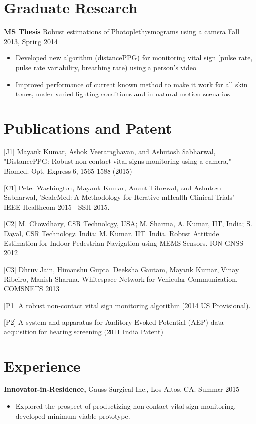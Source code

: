 \documentclass[margin]{res}
\begin{document}
\begin{resume}
\section{Graduate Research}
\textbf{MS Thesis} Robust estimations of Photoplethysmograms using a camera \hfill{Fall 2013, Spring 2014 }\\
 \begin{itemize} \itemsep -2pt  %
 \item Developed new algorithm (distancePPG) for monitoring vital sign (pulse rate, pulse rate variability, breathing rate) using a person's video 
 \item Improved performance of current known method to make it work for all skin tones, under varied lighting conditions and in natural motion scenarios 
 \end{itemize}

\section{Publications and Patent}
[J1] Mayank Kumar, Ashok Veeraraghavan, and Ashutosh Sabharwal, "DistancePPG: Robust non-contact vital signs monitoring using a camera," Biomed. Opt. Express 6, 1565-1588 (2015)

[C1] Peter Washington, Mayank Kumar, Anant Tibrewal, and Ashutosh Sabharwal, 'ScaleMed: A Methodology for Iterative mHealth Clinical Trials' IEEE Healthcom 2015 - SSH 2015.

[C2] M. Chowdhary, CSR Technology, USA; M. Sharma, A. Kumar, IIT, India; S. Dayal, CSR Technology, India; M. Kumar, IIT, India. Robust Attitude Estimation for Indoor Pedestrian Navigation using MEMS Sensors. ION GNSS 2012 

[C3] Dhruv Jain, Himanshu Gupta, Deeksha Gautam, Mayank Kumar, Vinay Ribeiro, Manish Sharma. Whitespace Network for Vehicular Communication. COMSNETS 2013

[P1] A robust non-contact vital sign monitoring algorithm (2014 US Provisional).

[P2] A system and apparatus for Auditory Evoked Potential (AEP) data acquisition for hearing screening (2011 India Patent)

\section{Experience}
  {\bf Innovator-in-Residence,} Gauss Surgical Inc., Los Altos, CA.  \hfill Summer  2015
  \begin{itemize} \itemsep -2pt
  \item Explored the prospect of productizing non-contact vital sign monitoring, developed minimum viable prototype. 
  

\end{itemize}
\end{resume}
\end{document}

